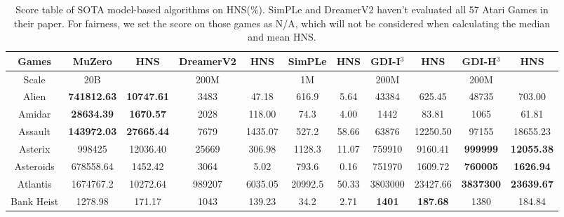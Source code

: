 \documentclass[nohyperref]{article}
\newcommand{\best}[1]{\textbf{#1}}
\theoremstyle{plain}
\begin{document}
\begin{table}[!hb]
\footnotesize
\begin{center}
\caption{Score table of SOTA model-based algorithms on HNS(\%). SimPLe \citep{modelbasedatari} and DreamerV2\citep{dreamerv2} haven't evaluated all 57 Atari Games in their paper. For fairness, we set the score on those games as N/A, which will not be considered when calculating the median and mean HNS.}
\label{Tab:Score table of SOTA model-based algorithms on HNS.}
\setlength{\tabcolsep}{1.0pt}
\begin{tabular}{|c |c c| c c| c c| c c| c c|}
\hline
 Games              & MuZero         & HNS      & DreamerV2 & HNS    & SimPLe             & HNS          & GDI-I$^3$     & HNS & GDI-H$^3$ & HNS \\
\hline
Scale               & 20B            &              & 200M      &            & 1M               &                  & 200M     &      &  200M   &\\
\hline  
 Alien              & \textbf{741812.63}      & \textbf{10747.61}     &3483       & 47.18      &616.9     & 5.64    & 43384       & 625.45                    &48735	             &703.00      \\
 Amidar             & \textbf{28634.39 }      & \textbf{1670.57    }  &2028       & 118.00     &74.3      & 4.00    & 1442        & 83.81                     &1065              &61.81 \\
 Assault            & \textbf{143972.03}      & \textbf{27665.44}     &7679       & 1435.07    &527.2     & 58.66   & 63876       & 12250.50                  &97155	             &18655.23\\
 Asterix            & 998425                  & 12036.40     &25669      & 306.98     &1128.3    & 11.07   & 759910      & 9160.41                   &\textbf{999999}   &\textbf{12055.38} \\
 Asteroids          & 678558.64             & 1452.42      &3064       & 5.02       &793.6     & 0.16               &751970& 1609.72           &\textbf{760005}            &\textbf{1626.94}  \\
 Atlantis           & 1674767.2             & 10272.64     &989207     & 6035.05    &20992.5   & 50.33              &3803000&23427.66          &\textbf{3837300}           &\textbf{23639.67}   \\
 Bank Heist         & 1278.98               & 171.17       &1043       & 139.23     &34.2      & 2.71               &\best{1401}  & \best{187.68  }           &1380              &184.84 \\

\end{tabular}
\end{center}
\end{table}
\end{document}
